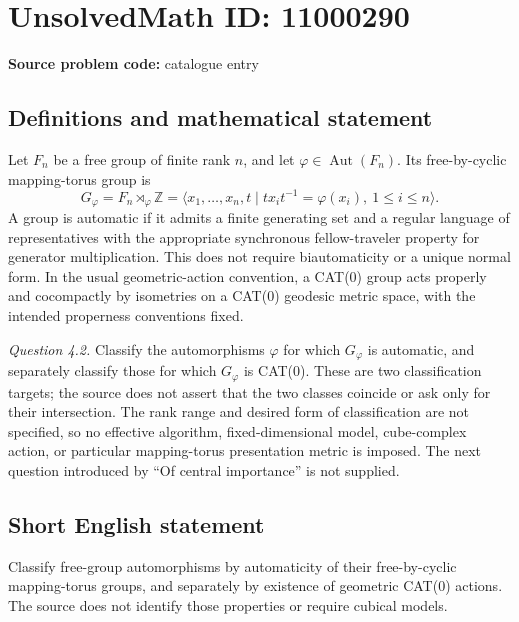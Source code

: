 \documentclass[11pt]{article}
\newcommand{\Z}{\mathbb{Z}}
\begin{document}
\section*{UnsolvedMath ID: 11000290}
\textbf{Source problem code:} catalogue entry
\subsection{Definitions and mathematical statement}
Let \(F_n\) be a free group of finite rank \(n\), and let \(\varphi\in\operatorname{Aut}(F_n)\). Its free-by-cyclic mapping-torus group is
\[
 G_\varphi=F_n\rtimes_\varphi\Z
 =\langle x_1,\ldots,x_n,t\mid
 tx_it^{-1}=\varphi(x_i),\ 1\leq i\leq n\rangle.
\]
A group is automatic if it admits a finite generating set and a regular language of representatives with the appropriate synchronous fellow-traveler property for generator multiplication. This does not require biautomaticity or a unique normal form. In the usual geometric-action convention, a CAT(0) group acts properly and cocompactly by isometries on a CAT(0) geodesic metric space, with the intended properness conventions fixed.

\emph{Question 4.2.} Classify the automorphisms \(\varphi\) for which \(G_\varphi\) is automatic, and separately classify those for which \(G_\varphi\) is CAT(0). These are two classification targets; the source does not assert that the two classes coincide or ask only for their intersection. The rank range and desired form of classification are not specified, so no effective algorithm, fixed-dimensional model, cube-complex action, or particular mapping-torus presentation metric is imposed. The next question introduced by ``Of central importance'' is not supplied.
\subsection{Short English statement}
Classify free-group automorphisms by automaticity of their free-by-cyclic mapping-torus groups, and separately by existence of geometric CAT(0) actions. The source does not identify those properties or require cubical models.
\end{document}
